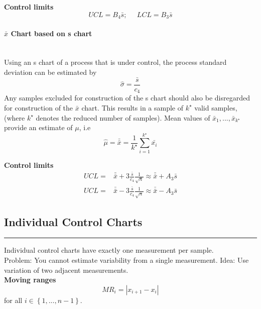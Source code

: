 \textbf{Control limits}
\begin{equation}
    UCL = B_4 \bar{s}; \;\;\;\;\;  LCL = B_3 \bar{s}
\end{equation}

\paragraph{$\bar{x}$ Chart based on s chart}\mbox{}\\
Using an s chart of a process that is under control, the process standard deviation can be estimated by
\begin{equation}
  \hat{\sigma} = \frac{\bar{s}}{c_4}
\end{equation}
Any samples excluded for construction of the s chart should also be disregarded for construction of the $\bar{x}$ chart.
This results in a sample of $k^\star$ valid samples, (where $k^\star$ denotes the reduced number of samples).
Mean values of $\bar{x}_1, ... ,\bar{x}_{k^\star}$ provide an estimate of $\mu$, i.e
\begin{equation}
  \hat{\mu} = \bar{\bar{x}} = \frac{1}{k^\star} \sum^{k^\star}_{i=1} \bar{x_i}
\end{equation}

\textbf{Control limits}
\begin{equation}
  \begin{split}
    UCL =& \bar{\bar{x}} + 3\frac{\bar{s}}{c_4} \frac{1}{\sqrt{n}} \approx \bar{\bar{x}} + A_3 \bar{s}\\
    UCL =& \bar{\bar{x}} - 3\frac{\bar{s}}{c_4} \frac{1}{\sqrt{n}} \approx \bar{\bar{x}} - A_3 \bar{s}
  \end{split}
\end{equation}

\subsection{Individual Control Charts}
\noindent\rule[\linienAbstand]{\linewidth}{\linienDicke}
Individual control charts have exactly one measurement per sample.\\
Problem: You cannot estimate variability from a single measurement.
Idea: Use variation of two adjacent measurements.\\

\textbf{Moving ranges}
\begin{equation}
  MR_i = |x_{i+1} - x_i|
\end{equation}
for all $i \in \left\{1,...,n-1\right\}$.\\

